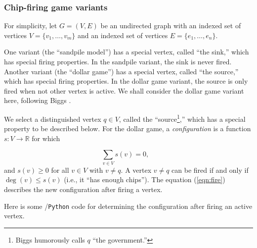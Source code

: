\subsubsection{Chip-firing game variants}

For simplicity, let $G=(V,E)$ be an undirected graph
with an indexed set of vertices $V=\{v_1,\dots, v_m\}$
and an indexed set of vertices $E=\{e_1,\dots, e_n\}$.

One variant (the ``sandpile model'') has a special vertex,
called ``the sink,'' which has special firing properties.
In the sandpile variant, the sink is never fired.
Another variant (the ``dollar game'') has a special vertex,
called ``the source,'' which has special firing properties.
In the dollar game variant, the source is only fired when
not other vertex is active.
We shall consider the dollar game variant here, following
Biggs \cite{Biggs2007}.

We select a distinguished vertex $q\in V$, called the
``source\footnote{Biggs humorously calls $q$ ``the government.''},''
which has a special property to be described below.
For the dollar game, a {\it configuration} is a
function $s:V\to {\mathbb{R}}$ for which

\[
\sum_{v\in V} s(v) = 0,\ \ \ \
\]
and $s(v)\geq 0$ for all $v\in V$ with $v\not= q$.
A vertex $v\not= q$ can be fired if and only if
$\deg (v)\leq s(v)$ (i.e., it ``has enough chips'').
The equation (\ref{eqn:fire}) describes the
new configuration after firing a vertex.

Here is some \sage/{\tt Python} code for determining the
configuration after firing an active vertex.

